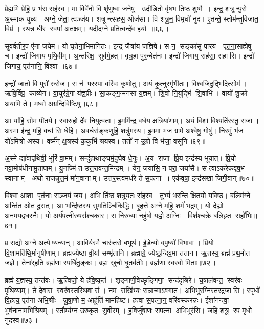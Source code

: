 प्रेह्य॒भि प्रेहि॒ प्र भ॑रा॒ सह॑स्व। मा विवे॑नो॒ वि शृ॑णुष्वा॒ जने॑षु। उदी॑डि॒तो वृ॑षभ॒ तिष्ठ॒ शुष्मै। इन्द्र॒ शत्रून्पु॒रो अ॒स्माक॑ युध्य। अग्ने॒ जेता॒ त्वञ्ज॑य। शत्रून्त्सहस॒ ओज॑सा। वि शत्रू॒न्॒ विमृधो॑ नुद। ए॒तन्ते॒ स्तोम॑न्तुविजात॒ विप्र॑। रथ॒न्न धीर॒ स्वपा॑ अतक्षम्। यदीद॑ग्ने॒ प्रति॒त्वन्दे॑व॒ हर्या॥६६॥

सुव॑र्वतीर॒प ए॑ना जयेम। यो घृ॒तेना॒भिमा॑नितः। इन्द्र॒ जैत्रा॑य जज्ञिषे। स न॒ सङ्का॑सु पारय। पृ॒त॒ना॒साह्ये॑षु च। इन्द्रो॑ जिगाय पृथि॒वीम्। अ॒न्तरि॑क्ष॒ सुव॑र्म॒हत्। वृ॒त्र॒हा पु॑रु॒चेत॑नः। इन्द्रो॑ जिगाय॒ सह॑सा॒ सहासि। इन्द्रो॑ जिगाय॒ पृत॑नानि॒ विश्वा॥६७॥

इन्द्रो॑ जा॒तो वि पुरो॑ रुरोज। स न॑ पर॒स्पा वरि॑वः कृणोतु। अ॒यं कृ॒त्नुरगृ॑भीतः। वि॒श्व॒जिदु॒द्भिदित्सोम॑। ऋषि॒र्विप्र॒ काव्ये॑न। वा॒युर॑ग्रे॒गा य॑ज्ञ॒प्रीः। सा॒कङ्ग॒न्मन॑सा य॒ज्ञम्। शि॒वो नि॒युद्भि॑ शि॒वाभि॑। वायो॑ शु॒क्रो अ॑यामि ते। मध्वो॒ अग्र॒न्दिवि॑ष्टिषु॥६८॥

आ या॑हि॒ सोम॑ पीतये। स्वा॒रु॒हो दे॑व नि॒युत्व॑ता। इ॒ममि॑न्द्र वर्धय क्ष॒त्रिया॑णाम्। अ॒यं वि॒शां वि॒श्पति॑रस्तु॒ राजा। अ॒स्मा इ॑न्द्र॒ महि॒ वर्चासि धेहि। अ॒व॒र्चस॑ङ्कणुहि॒ शत्रु॑मस्य। इ॒ममा भ॑ज॒ ग्रामे॒ अश्वे॑षु॒ गोषु॑। निर॒मुं भ॑ज॒ यो॑ऽमित्रो॑ अस्य। वर्ष्म॑न् क्ष॒त्रस्य॑ क॒कुभि॑ श्रयस्व। ततो॑ न उ॒ग्रो वि भ॑जा॒ वसू॑नि॥६९॥

अ॒स्मे द्या॑वापृथिवी॒ भूरि॑ वा॒मम्। सन्दु॑हाथाङ्घर्म॒दुघे॑व धे॒नुः। अ॒य राजा प्रि॒य इन्द्र॑स्य भूयात्। प्रि॒यो गवा॒मोष॑धीनामु॒तापाम्। यु॒नज्मि॑ त उत्त॒राव॑न्त॒मिन्द्रम्। येन॒ जया॑सि॒ न परा॒ जया॑सै। स त्वा॑ऽकरेकवृष॒भ स्वानाम्। अथो॑ राजन्नुत्त॒मं मा॑न॒वानाम्। उत्त॑र॒स्त्वमध॑रे ते स॒पत्ना। एक॑वृषा॒ इन्द्र॑सखा जिगी॒वान्॥७०॥

विश्वा॒ आशा॒ पृत॑नाः स॒ञ्जयं॒ जय\sn{}। अ॒भि ति॑ष्ठ शत्रूय॒तः स॑हस्व। तुभ्यं॑ भरन्ति क्षि॒तयो॑ यविष्ठ। ब॒लिम॑ग्ने॒ अन्ति॑त॒ ओत दू॒रात्। आ भन्दि॑ष्ठस्य सुम॒तिञ्चि॑किद्धि। बृ॒हत्ते॑ अग्ने॒ महि॒ शर्म॑ भ॒द्रम्। यो दे॒ह्यो अन॑मयद्वध॒स्नैः। यो अर्य॑पत्नीरु॒षस॑श्च॒कार॑। स नि॒रुध्या॒ नहु॑षो य॒ह्वो अ॒ग्निः। विश॑श्चक्रे बलि॒हृत॒ सहो॑भिः॥७१॥

प्र स॒द्यो अ॑ग्ने॒ अत्येष्य॒न्यान्। आ॒विर्यस्मै॒ चारु॑तरो ब॒भूथ॑। ई॒डेन्यो॑ वपु॒ष्यो॑ वि॒भावा। प्रि॒यो वि॒शामति॑थि॒र्मानु॑षीणाम्। ब्रह्म॑ज्येष्ठा वी॒र्या॑ सम्भृ॑तानि। ब्रह्माग्रे॒ ज्येष्ठ॒न्दिव॒मा त॑तान। ऋ॒तस्य॒ ब्रह्म॑ प्रथ॒मोत ज॑ज्ञे। तेना॑र्‌हति॒ ब्रह्म॑णा॒ स्पर्धि॑तु॒ङ्कः। ब्रह्म॒ स्रुचो॑ घृ॒तव॑तीः। ब्रह्म॑णा॒ स्वर॑वो मि॒ताः॥७२॥

ब्रह्म॑ य॒ज्ञस्य॒ तन्त॑वः। ऋ॒त्विजो॒ ये ह॑वि॒ष्कृत॑। शृङ्गा॑णी॒वेच्छृ॒ङ्गिणा॒ सन्द॑दृश्रिरे। च॒षाल॑वन्त॒ स्वर॑वः पृथि॒व्याम्। ते दे॒वास॒ स्वर॑वस्तस्थि॒वास॑। नम॒ सखि॑भ्यः स॒न्नान्माऽव॑गात। अ॒भि॒भूर॒ग्निर॑तर॒द्रजासि। स्पृधो॑ वि॒हत्य॒ पृत॑ना अभि॒श्रीः। जु॒षा॒णो म॒ आहु॑तिं मामहिष्ट। ह॒त्वा स॒पत्ना॒न्॒ वरि॑वस्करन्नः। ईशा॑नन्त्वा॒ भुव॑नानामभि॒श्रियम्। स्तौम्य॑ग्न उरु॒कृत सु॒वीरम्। ह॒विर्जु॑षा॒णः स॒पत्ना अभि॒भूर॑सि। ज॒हि शत्रू॒ रप॒ मृधो॑ नुदस्व॥७३॥\anuvakamend[वि॒शाञ्ज॑यामसि जीरदानो॒ हर्या॒ विश्वा॒ दिवि॑ष्टिषु॒ वसू॑नि जिगी॒वान्त्सहो॑भिर्मि॒ता न॑श्च॒त्वारि॑ च]

